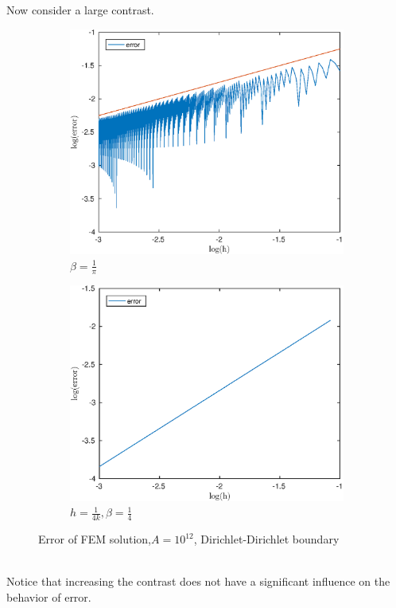 \documentclass[12pt]{article}
\begin{document}
Now consider a large contrast.
\pagebreak
\begin{figure}[h!]
\centering
\begin{subfigure}{0.4\textwidth}
\includegraphics[width=\textwidth]{error-pi-DD-12}
\caption{$\beta=\frac{1}{\pi}$}
\end{subfigure}
\hfill
\begin{subfigure}{0.4\textwidth}
\includegraphics[width=\textwidth]{error-4-DD-12}
\caption{$h=\frac{1}{4k},\beta=\frac{1}{4}$}
\end{subfigure}
\caption{Error of FEM solution,$A=10^{12}$, Dirichlet-Dirichlet boundary}
\end{figure} \\
Notice that increasing the contrast does not have a significant influence on the behavior of error.
\end{document}
